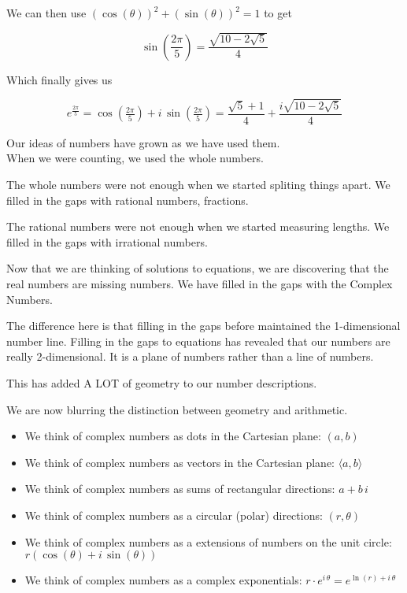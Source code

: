 \documentclass{ximera}
\begin{document}
\begin{claim}
We can then use $(\cos(\theta))^2 +  (\sin(\theta))^2 = 1$ to get 


\[   \sin\left(\frac{2\pi}{5}\right)  =  \frac{\sqrt{10 - 2 \sqrt{5}}}{4}  \]




Which finally gives us



\[   e^{\tfrac{2\pi}{5}} = \cos(\tfrac{2\pi}{5}) + i \, \sin(\tfrac{2\pi}{5}) =  \frac{\sqrt{5} + 1}{4} +   \frac{i \sqrt{10 - 2 \sqrt{5}}}{4}     \]

\end{claim}







Our ideas of numbers have grown as we have used them. \\

When we were counting, we used the whole numbers.

The whole numbers were not enough when we started spliting things apart.  We filled in the gaps with rational numbers, fractions.

The rational numbers were not enough when we started measuring lengths. We filled in the gaps with irrational numbers.

Now that we are thinking of solutions to equations, we are discovering that the real numbers are missing numbers.  We have filled in the gaps with the Complex Numbers.

The difference here is that filling in the gaps before maintained the 1-dimensional number line.  Filling in the gaps to equations has revealed that our numbers are really 2-dimensional.  It is a plane of numbers rather than a line of numbers.

This has added A LOT of geometry to our number descriptions.

We are now blurring the distinction between geometry and arithmetic.

\begin{itemize}
\item We think of complex numbers as dots in the Cartesian plane:  $(a, b)$
\item We think of complex numbers as vectors in the Cartesian plane:  $\langle a, b \rangle$
\item We think of complex numbers as sums of rectangular directions:  $a + b \, i$
\item We think of complex numbers as a circular (polar) directions:  $(r, \theta)$
\item We think of complex numbers as a extensions of numbers on the unit circle:  $r(\cos(\theta)+i \, \sin(\theta))$
\item We think of complex numbers as a complex exponentials:  $r\cdot e^{i\, \theta} = e^{\ln(r)+i\, \theta}$
\end{itemize}
\end{document}
